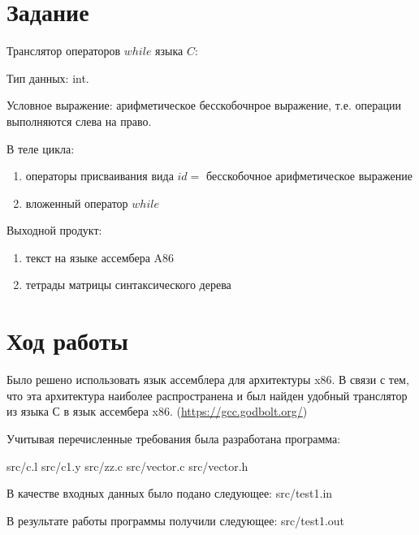 





\section{Задание}
    Транслятор операторов $while$ языка $C$:
    
    Тип данных: int.
    
    Условное выражение: арифметическое бесскобочнрое выражение,
    т.е. операции выполняются слева на право.

    В теле цикла:
    \begin{enumerate}
        \item операторы присваивания вида $id=$ бесскобочное арифметическое выражение
        \item вложенный оператор $while$
    \end{enumerate}

    Выходной продукт:
    \begin{enumerate}
        \item текст на языке ассембера A86
        \item тетрады матрицы синтаксического дерева
    \end{enumerate}

\section{Ход работы}

    Было решено использовать язык ассемблера для архитектуры x86. 
    В связи с тем, что эта архитектура наиболее распространена 
    и был найден удобный транслятор из языка С в язык ассембера x86.
    (\href{https://gcc.godbolt.org/}{https://gcc.godbolt.org/})


    Учитывая перечисленные требования была разработана программа:

     {src/c.l}
     {src/c1.y}
     {src/zz.c}
     {src/vector.c}
     {src/vector.h}

    В качестве входных данных было подано следующее:
     {src/test1.in}

    В результате работы программы получили следующее:
     {src/test1.out}

